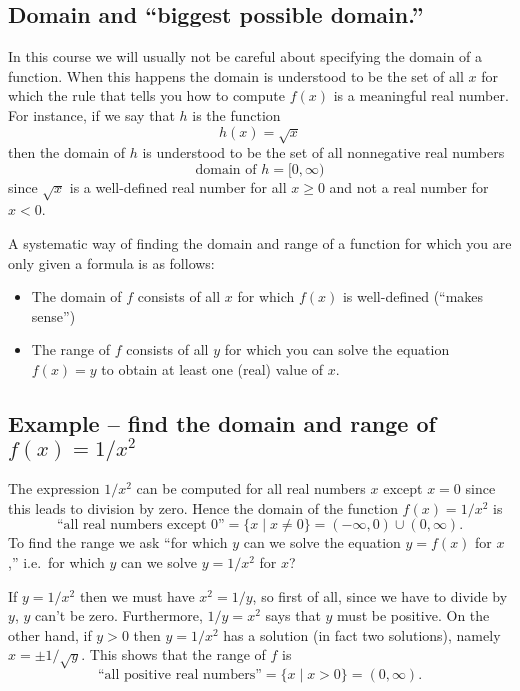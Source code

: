 \subsection{Domain and ``biggest possible domain.'' } 
In this course we will usually not be careful about specifying the
domain of a function.  When this happens the domain is understood to
be the set of all $x$ for which the rule that tells you how to
compute $f(x)$ is a meaningful real number.  For instance, if we say that $h$ is the
function
\[
h(x) = \sqrt x
\]
then the domain of $h$ is understood to be the set of all nonnegative real
numbers
\[
\text{domain of $h$} = [0, \infty)
\]
since $\sqrt x$ is a well-defined real number for all $x\geq 0$ and not a real number for $x<0$.


A systematic way of finding the domain and range of a function for which you are
only given a formula is as follows:
\begin{itemize}
\item The domain of $f$ consists of all $x$ for which $f(x)$ is well-defined
  (``makes sense'')
\item The range of $f$ consists of all $y$ for which you can solve the
  equation $f(x) = y$ to obtain at least one (real) value of $x$.
\end{itemize}


\subsection{Example -- find the domain and range of $f(x) = 1/x^2$} 
The expression $1/x^2$ can be computed for all real numbers $x$ except
$x=0$ since this leads to division by zero.  Hence the domain of the
function $f(x) = 1/x^2$ is
\[
\text{``all real numbers except $0$''}
=\bigl\{x \mid x\neq0\bigr\} = (-\infty, 0)\cup(0, \infty).
\]
To find the range we ask ``for which $y$ can we solve the equation
$y=f(x)$ for $x$,'' i.e.\ for which $y$ can we solve $y=1/{x^2}$ for
$x$?


If $y=1/x^2$ then we must have $x^2 = 1/y$, so first of all, since we
have to divide by $y$, $y$ can't be zero.  Furthermore, $1/y=x^2$ says
that $y$ must be positive.  On the other hand, if $y>0$ then $y=1/x^2$
  has a solution (in fact two solutions), namely $x=\pm1/\sqrt{y}$.  This
shows that the range of $f$ is
\[
\text{``all positive real numbers''} = \{x \mid x>0\} = (0, \infty).
\]
